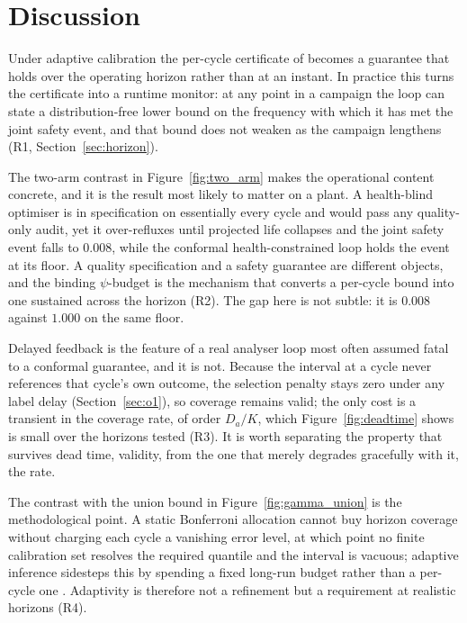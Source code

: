 \documentclass[review,12pt]{elsarticle}
\begin{document}
\section{Discussion}
\label{sec:discussion}

Under adaptive calibration the per-cycle certificate of \citet{busico_m4} becomes a guarantee
that holds over the operating horizon rather than at an instant. In practice this turns the
certificate into a runtime monitor: at any point in a campaign the loop can state a
distribution-free lower bound on the frequency with which it has met the joint safety event,
and that bound does not weaken as the campaign lengthens (R1, Section~\ref{sec:horizon}).

The two-arm contrast in Figure~\ref{fig:two_arm} makes the operational content concrete, and it
is the result most likely to matter on a plant. A health-blind optimiser is in specification on
essentially every cycle and would pass any quality-only audit, yet it over-refluxes until
projected life collapses and the joint safety event falls to $0.008$, while the conformal
health-constrained loop holds the event at its floor. A quality specification and a safety
guarantee are different objects, and the binding $\psi$-budget is the mechanism that converts a
per-cycle bound into one sustained across the horizon (R2). The gap here is not subtle: it is
$0.008$ against $1.000$ on the same floor.

Delayed feedback is the feature of a real analyser loop most often assumed fatal to a conformal
guarantee, and it is not. Because the interval at a cycle never references that cycle's own
outcome, the selection penalty stays zero under any label delay (Section~\ref{sec:o1}), so
coverage remains valid; the only cost is a transient in the coverage rate, of order $D_a/K$,
which Figure~\ref{fig:deadtime} shows is small over the horizons tested (R3). It is worth
separating the property that survives dead time, validity, from the one that merely degrades
gracefully with it, the rate.

The contrast with the union bound in Figure~\ref{fig:gamma_union} is the methodological point. A
static Bonferroni allocation cannot buy horizon coverage without charging each cycle a vanishing
error level, at which point no finite calibration set resolves the required quantile and the
interval is vacuous; adaptive inference sidesteps this by spending a fixed long-run budget
rather than a per-cycle one \citep{gibbs2021}. Adaptivity is therefore not a refinement but a
requirement at realistic horizons (R4).
\end{document}
